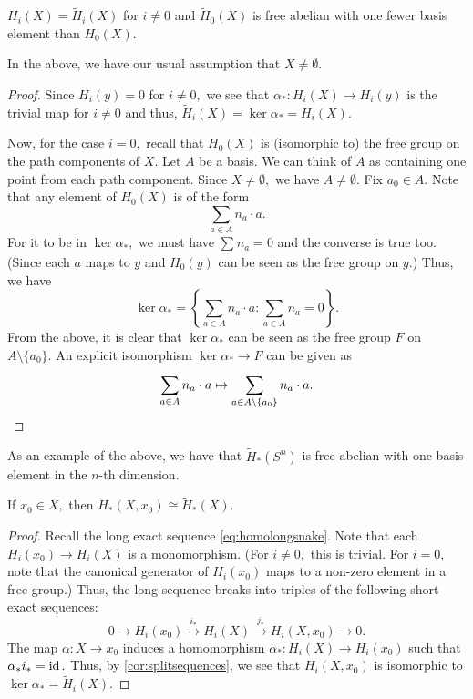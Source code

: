 \documentclass[12pt]{article}
\begin{document}
\begin{prop}
	$H_i(X) = \widetilde{H}_i(X)$ for $i \neq 0$ and $\widetilde{H}_0(X)$ is free abelian with one fewer basis element than $H_0(X).$
\end{prop}
In the above, we have our usual assumption that $X \neq \emptyset.$
\begin{proof} 
	Since $H_i(y) = 0$ for $i \neq 0,$ we see that $\alpha_*:H_i(X) \to H_i(y)$ is the trivial map for $i \neq 0$ and thus, $\widetilde{H}_i(X) = \ker \alpha_* = H_i(X).$

	Now, for the case $i = 0,$ recall that $H_0(X)$ is (isomorphic to) the free group on the path components of $X.$ Let $A$ be a basis. We can think of $A$ as containing one point from each path component. Since $X \neq \emptyset,$ we have $A \neq \emptyset.$ Fix $a_0 \in A.$ Note that any element of $H_0(X)$ is of the form
	\begin{equation*} 
		\sum_{a \in A}n_a\cdot a.
	\end{equation*}
	For it to be in $\ker \alpha_*,$ we must have $\sum_{}^{}n_a = 0$ and the converse is true too. (Since each $a$ maps to $y$ and $H_0(y)$ can be seen as the free group on $y.$) Thus, we have
	\begin{equation*} 
		\ker\alpha_* = \left\{\sum_{a \in A}^{}n_a\cdot a : \sum_{a \in A}^{}n_a = 0\right\}.
	\end{equation*} 
	From the above, it is clear that $\ker \alpha_*$ can be seen as the free group $F$ on $A\setminus\{a_0\}.$ An explicit isomorphism $\ker \alpha_* \to F$ can be given as
	\begin{equation*} 
		\sum_{a \in A}^{}n_a\cdot a \mapsto \sum_{a \in A\setminus\{a_0\}}^{}n_a \cdot a. \qedhere
	\end{equation*}
\end{proof}

As an example of the above, we have that $\widetilde{H}_*(S^n)$ is free abelian with one basis element in the $n$-th dimension.

\begin{prop} \label{prop:reducedhomorelativehomo}
	If $x_0 \in X,$ then $H_*(X, x_0) \cong \widetilde{H}_*(X).$
\end{prop}
\begin{proof} 
	Recall the long exact sequence \cref{eq:homolongsnake}. Note that each $H_i(x_0) \to H_i(X)$ is a monomorphism. (For $i \neq 0,$ this is trivial. For $i = 0,$ note that the canonical generator of $H_i(x_0)$ maps to a non-zero element in a free group.) Thus, the long sequence breaks into triples of the following short exact sequences:
	\begin{equation*} 
		0 \to H_i(x_0) \overset{i_*}{\longrightarrow} H_i(X) \overset{j_*}{\longrightarrow} H_i(X, x_0) \to 0.
	\end{equation*}
	The map $\alpha:X \to x_0$ induces a homomorphism $\alpha_*:H_i(X) \to H_i(x_0)$ such that $\alpha_*i_* = \operatorname{id}.$ Thus, by \cref{cor:splitsequences}, we see that $H_i(X, x_0)$ is isomorphic to $\ker \alpha_* = \widetilde{H}_i(X).$
\end{proof}
\end{document}
